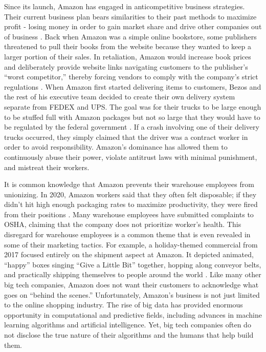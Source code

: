 \documentclass[twoside]{article}
\begin{document}
Since its launch, Amazon has engaged in anticompetitive business strategies. Their current business plan bears similarities to their past methods to maximize profit - losing money in order to gain market share and drive other companies out of business \cite{amazon1}. Back when Amazon was a simple online bookstore, some publishers threatened to pull their books from the website because they wanted to keep a larger portion of their sales. In retaliation, Amazon would increase book prices and deliberately provide website links navigating customers to the publisher's ``worst competitor,'' thereby forcing vendors to comply with the company's strict regulations \cite{amazon1}. When Amazon first started delivering items to customers, Bezos and the rest of his executive team decided to create their own delivery system separate from FEDEX and UPS. The goal was for their trucks to be large enough to be stuffed full with Amazon packages but not so large that they would have to be regulated by the federal government \cite{amazon1}. If a crash involving one of their delivery trucks occurred, they simply claimed that the driver was a contract worker in order to avoid responsibility. Amazon’s dominance has allowed them to continuously abuse their power, violate antitrust laws with minimal punishment, and mistreat their workers.

It is common knowledge that Amazon prevents their warehouse employees from unionizing. In 2020, Amazon  workers said that they often felt disposable; if they didn't hit high enough packaging rates to maximize productivity, they were fired from their positions \cite{amazon1}. Many warehouse employees have submitted complaints to OSHA, claiming that the company does not prioritize worker’s health. This disregard for warehouse employees is a common theme that is even revealed in some of their marketing tactics. For example, a holiday-themed commercial from 2017 focused entirely on the shipment aspect at Amazon. It depicted animated, “happy” boxes singing “Give a Little Bit” together, hopping along conveyor belts, and practically shipping themselves to people around the world \cite{amazon2}. Like many other big tech companies, Amazon does not want their customers to acknowledge what goes on “behind the scenes.” Unfortunately, Amazon's business is not just limited to the online shopping industry. The rise of big data has provided enormous opportunity in computational and predictive fields, including advances in machine learning algorithms and artificial intelligence. Yet, big tech companies often do not disclose the true nature of their algorithms and the humans that help build them.
\end{document}

